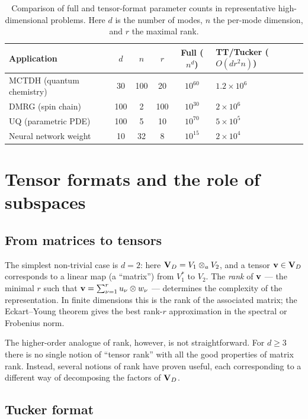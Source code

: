 \begin{table}[h]
\centering
\caption{Comparison of full and tensor-format parameter counts in
representative high-dimensional problems. Here $d$ is the number of
modes, $n$ the per-mode dimension, and $r$ the maximal rank.}
\label{tab:sizes}
\begin{tabular}{@{}lccccl@{}}
\toprule
Application & $d$ & $n$ & $r$ & Full ($n^d$) & TT/Tucker ($O(dr^2n)$) \\
\midrule
MCTDH (quantum chemistry) & 30 & 100 & 20 & $10^{60}$ & $1.2 \times 10^6$ \\
DMRG (spin chain) & 100 & 2 & 100 & $10^{30}$ & $2 \times 10^6$ \\
UQ (parametric PDE) & 100 & 5 & 10 & $10^{70}$ & $5 \times 10^5$ \\
Neural network weight & 10 & 32 & 8 & $10^{15}$ & $2 \times 10^4$ \\
\bottomrule
\end{tabular}
\end{table}

\section{Tensor formats and the role of subspaces}
\label{sec:intro:formats}

\subsection*{From matrices to tensors}

The simplest non-trivial case is $d = 2$: here $\mathbf{V}_D = V_1 \otimes_a V_2$,
and a tensor $\mathbf{v} \in \mathbf{V}_D$ corresponds to a linear map (a ``matrix'')
from $V_1^*$ to $V_2$. The \emph{rank} of $\mathbf{v}$ — the minimal $r$
such that $\mathbf{v} = \sum_{\nu=1}^r u_\nu \otimes w_\nu$ — determines the
complexity of the representation. In finite dimensions this is the rank
of the associated matrix; the Eckart--Young theorem gives the best
rank-$r$ approximation in the spectral or Frobenius norm.

The higher-order analogue of rank, however, is not straightforward.
For $d \geq 3$ there is no single notion of ``tensor rank'' with all
the good properties of matrix rank. Instead, several notions of rank
have proven useful, each corresponding to a different way of
decomposing the factors of $\mathbf{V}_D$.

\subsection*{Tucker format}


